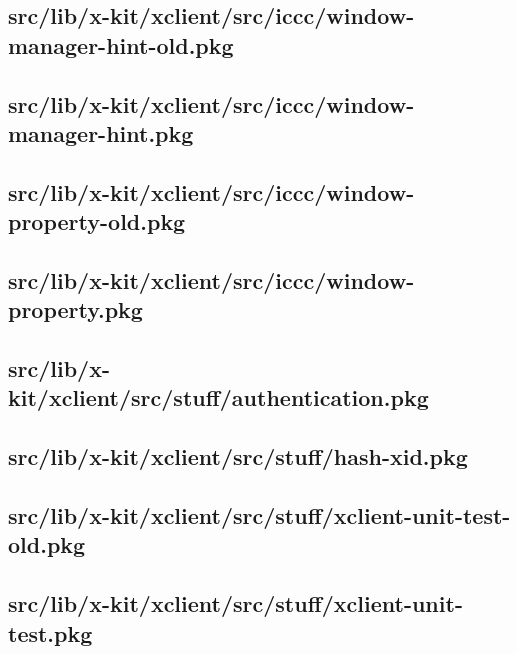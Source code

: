 \subsection{src/lib/x-kit/xclient/src/iccc/window-manager-hint-old.pkg}


\subsection{src/lib/x-kit/xclient/src/iccc/window-manager-hint.pkg}


\subsection{src/lib/x-kit/xclient/src/iccc/window-property-old.pkg}


\subsection{src/lib/x-kit/xclient/src/iccc/window-property.pkg}


\subsection{src/lib/x-kit/xclient/src/stuff/authentication.pkg}


\subsection{src/lib/x-kit/xclient/src/stuff/hash-xid.pkg}


\subsection{src/lib/x-kit/xclient/src/stuff/xclient-unit-test-old.pkg}


\subsection{src/lib/x-kit/xclient/src/stuff/xclient-unit-test.pkg}


